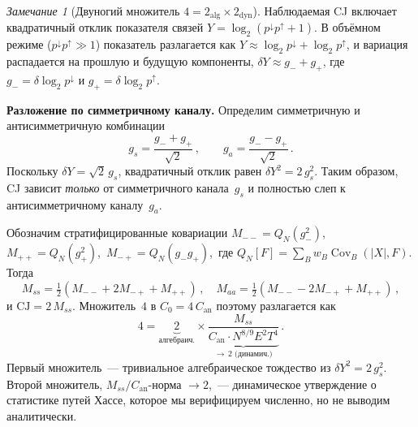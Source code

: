 \documentclass[12pt,a4paper]{article}
\theoremstyle{plain}
\theoremstyle{definition}
\theoremstyle{remark}
\newtheorem{remark}[theorem]{Замечание}
\newcommand{\Cov}{\operatorname{Cov}}
\newcommand{\CJ}{\mathrm{CJ}}
\begin{document}
\begin{remark}[Двуногий множитель $4 = 2_{\mathrm{alg}} \times 2_{\mathrm{dyn}}$]
\label{rem:factor4}
Наблюдаемая CJ включает квадратичный отклик показателя связей
$Y = \log_2(p^{\downarrow} p^{\uparrow} + 1)$.  В объёмном
режиме ($p^{\downarrow} p^{\uparrow} \gg 1$) показатель
разлагается как
$Y \approx \log_2 p^{\downarrow} + \log_2 p^{\uparrow}$,
и вариация распадается на прошлую и будущую компоненты,
$\delta Y \approx g_- + g_+$, где
$g_- = \delta \log_2 p^{\downarrow}$ и
$g_+ = \delta \log_2 p^{\uparrow}$.

\medskip\noindent\textbf{Разложение по симметричному каналу.}\enspace
Определим симметричную и антисимметричную комбинации
\begin{equation}\label{eq:gs-ga}
  g_s = \frac{g_- + g_+}{\sqrt{2}}\,,\qquad
  g_a = \frac{g_- - g_+}{\sqrt{2}}\,.
\end{equation}
Поскольку $\delta Y = \sqrt{2}\,g_s$, квадратичный отклик
равен $\delta Y^2 = 2\,g_s^2$.  Таким образом, CJ зависит
\emph{только} от симметричного канала~$g_s$ и полностью
слеп к антисимметричному каналу~$g_a$.

Обозначим стратифицированные ковариации
$M_{--} = Q_N(g_-^2)$,\, $M_{++} = Q_N(g_+^2)$,\,
$M_{-+} = Q_N(g_- g_+)$,\, где
$Q_N[F] = \sum_B w_B \Cov_B(|X|, F)$.  Тогда
\begin{equation}\label{eq:Mss-def}
  M_{ss} = \tfrac{1}{2}(M_{--} + 2M_{-+} + M_{++})\,,\quad
  M_{aa} = \tfrac{1}{2}(M_{--} - 2M_{-+} + M_{++})\,,
\end{equation}
и $\CJ = 2\,M_{ss}$.  Множитель~$4$ в
$C_0 = 4\,C_{\mathrm{an}}$ поэтому разлагается как
\begin{equation}\label{eq:factor4-decomp}
  4 = \underbrace{2}_{\text{алгебраич.}} \times
      \underbrace{\frac{M_{ss}}{C_{\mathrm{an}} \cdot N^{8/9} E^2 T^4}}_{\to\, 2\text{ (динамич.)}}\,.
\end{equation}
Первый множитель~--- тривиальное алгебраическое тождество из
$\delta Y^2 = 2\,g_s^2$.  Второй множитель,
$M_{ss} / C_{\mathrm{an}}$-норма $\to 2$,~--- динамическое
утверждение о статистике путей Хассе, которое мы верифицируем
численно, но не выводим аналитически.


\end{remark}
\end{document}
